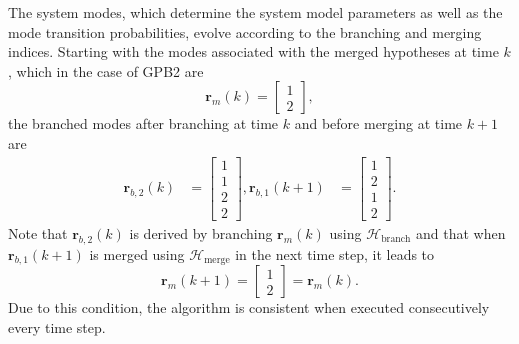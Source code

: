 {{%
The system modes, which determine the system model parameters as well as the mode transition probabilities, evolve according to the branching and merging indices. Starting with the modes associated with the merged hypotheses at time $k$, which in the case of GPB2 are
%
\begin{equation} \label{eq:rmk_GPB2}
		\mathbf{r}_m(k) = \begin{bmatrix} 1 \\ 2 \end{bmatrix},
\end{equation}
the branched modes after branching at time $k$ and before merging at time $k+1$ are
%
%
\begin{equation} \label{eq:rbk_GPB2}
	\begin{aligned}
		\mathbf{r}_{b,2}(k) &= \begin{bmatrix} 1 \\ 1 \\ 2 \\ 2 \end{bmatrix},
		\mathbf{r}_{b,1}(k+1) &= \begin{bmatrix} 1 \\ 2 \\ 1 \\ 2 \end{bmatrix}.
	\end{aligned}
\end{equation}
Note that $\mathbf{r}_{b,2}(k)$ is derived by branching $\mathbf{r}_m(k)$ using $\mathcal{H}_{\text{branch}}$ and that when $\mathbf{r}_{b,1}(k+1)$ is merged using $\mathcal{H}_{\text{merge}}$ in the next time step, it leads to 
\begin{equation} \label{eq:rmkp1rmk_GPB2}
	\mathbf{r}_m(k+1) = \begin{bmatrix} 1 \\ 2 \end{bmatrix} = \mathbf{r}_m(k).
\end{equation}
Due to this condition, the algorithm is consistent when executed consecutively every time step.

}}
